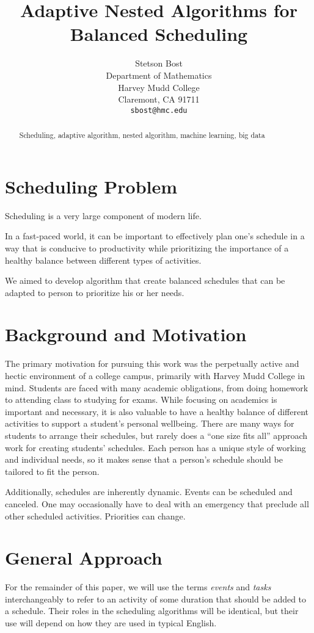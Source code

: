 \documentclass{article}
\title{Adaptive Nested Algorithms for Balanced Scheduling}
\author{
  Stetson Bost\\
  Department of Mathematics\\
  Harvey Mudd College\\
  Claremont, CA 91711 \\
  \texttt{sbost@hmc.edu}\\
}
\newcommand{\todo}[1]{}
\begin{document}

\maketitle

\begin{abstract}
Scheduling, adaptive algorithm, nested algorithm, machine learning, big data
\end{abstract}

\section{Scheduling Problem}
	Scheduling is a very large component of modern life.
	\todo{``Find details about scheduling, wellness, (work-life) balance, etc.''}
	In a fast-paced world, it can be important to effectively plan one's schedule in a way that is conducive to productivity while prioritizing the importance of a healthy balance between different types of activities. 

	We aimed to develop algorithm that create balanced schedules that can be adapted to person to prioritize his or her needs.


\section{Background and Motivation}
	The primary motivation for pursuing this work was the perpetually active and hectic environment of a college campus, primarily with Harvey Mudd College in mind.
	Students are faced with many academic obligations, from doing homework to attending class to studying for exams.
	While focusing on academics is important and necessary, it is also valuable to have a healthy balance of different activities to support a student's personal wellbeing.
	There are many ways for students to arrange their schedules, but rarely does a ``one size fits all'' approach work for creating students' schedules.
	Each person has a unique style of working and individual needs, so it makes sense that a person's schedule should be tailored to fit the person.

	Additionally, schedules are inherently dynamic.
	Events can be scheduled and canceled.
	One may occasionally have to deal with an emergency that preclude all other scheduled activities.
	Priorities can change.
	\todo{``expand this section''}

\section{General Approach}
	For the remainder of this paper, we will use the terms \emph{events} and \emph{tasks} interchangeably to refer to an activity of some duration that should be added to a schedule.
	Their roles in the scheduling algorithms will be identical, but their use will depend on how they are used in typical English.
\end{document}
